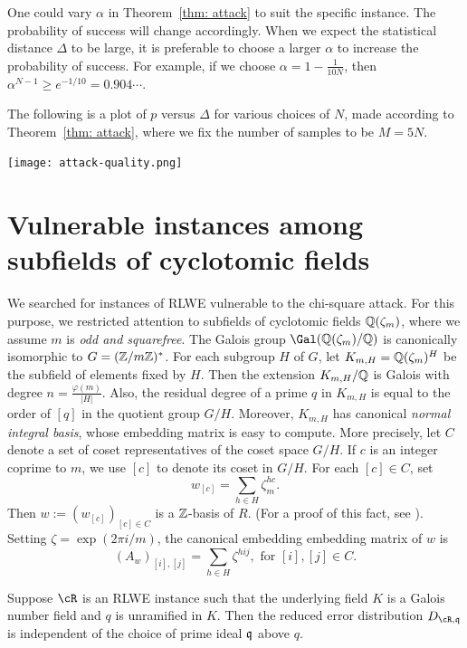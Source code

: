 \documentclass{amsart}
\begin{document}
\begin{remark}
One could vary $\alpha$ in Theorem~\ref{thm: attack} to suit the specific instance.
The probability of success will change accordingly. When we expect the statistical distance $\Delta$ to be large, it is preferable to choose a larger $\alpha$ to increase the probability of success.  For example, if we choose $\alpha = 1-\frac{1}{10N}$, then $\alpha^{N-1} \geq e^{-1/10} = 0.904 \cdots$. 
\end{remark}

The following is a plot of $p$ versus $\Delta$ for various choices of $N$, made according to Theorem~\ref{thm: attack}, where we fix the number of samples to be $M = 5N$.

\begin{center}
\texttt{[image: attack-quality.png]}
\end{center}

\section{Vulnerable instances among subfields of cyclotomic fields}\label{sec: sub-cyclotomics}

We searched for instances of RLWE vulnerable to the chi-square attack.  For this purpose, we restricted attention to subfields of cyclotomic fields $\mathbb{Q}(\zeta_m)$, where we assume $m$ is {\it odd and squarefree}. The Galois group $\Gal(\bQ(\zeta_m)/\bQ)$ is canonically isomorphic to $G = (\mathbb{Z}/m\mathbb{Z})^*$. For each subgroup $H$ of $G$, let $K_{m,H} = \mathbb{Q}(\zeta_m)^H$ be the subfield of elements fixed by $H$.
Then the extension $K_{m,H}/\mathbb{Q}$ is Galois with degree $n = \frac{\varphi(m)}{|H|}$. Also, the residual degree of a prime $q$ in $K_{m,H}$ is equal to the order of $[q]$ in the quotient group $G/H$. Moreover, $K_{m,H}$ has canonical {\it normal integral basis}, whose embedding matrix is easy to compute. More precisely, let $C$ denote a set of coset representatives of the coset space $G/H$. If $c$ is an integer coprime to $m$, we use $[c]$ to denote its coset in $G/H$. For each $[c] \in C$, set
\[
    w_{[c]} =  \sum_{h \in H} \zeta_m^{hc}.
\]
Then  $w := (w_{[c]})_{[c] \in C}$ is a $\mathbb{Z}$-basis of $R$. (For a proof of this fact, see \cite[Proposition 6.1]{johnston2011notes}). Setting $\zeta = \exp(2\pi i /m)$, the canonical embedding embedding matrix of $w$ is
\[
    (A_w)_{[i],[j]} = \sum_{h \in H}{\zeta^{hij}}, \mbox{ for } [i], [j] \in C.
\]

\begin{Lemma} \label{lem: symmetry}
Suppose $\cR$ is an RLWE instance such that the underlying field $K$ is a Galois number field and $q$ is unramified in $K$. Then the reduced error distribution $D_{\cR,\fq}$ is independent of the choice of prime ideal $\mathfrak{q}$ above $q$.
\end{Lemma}
\end{document}
